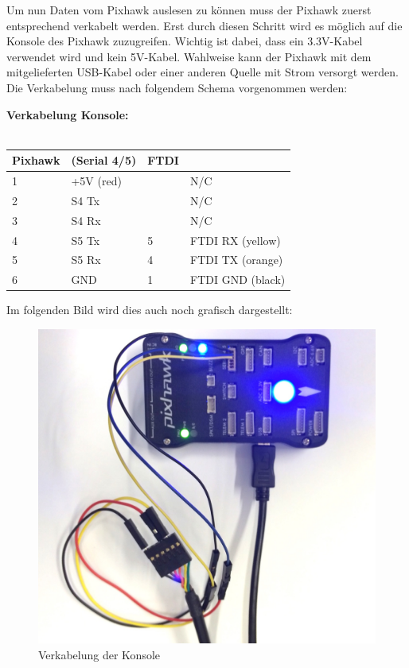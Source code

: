 \documentclass[12pt]{article} %
\begin{document}
	Um nun Daten vom Pixhawk auslesen zu können muss der Pixhawk zuerst entsprechend verkabelt werden. Erst durch diesen Schritt wird es möglich auf die Konsole des Pixhawk zuzugreifen. Wichtig ist dabei, dass ein 3.3V-Kabel verwendet wird und kein 5V-Kabel. Wahlweise kann der Pixhawk mit dem mitgelieferten USB-Kabel oder einer anderen Quelle mit Strom versorgt werden. Die Verkabelung muss nach folgendem Schema vorgenommen werden:\\
\begin{description}
	\item \textbf{Verkabelung Konsole:}\\ \\
	\begin{tabular}{p{2cm}p{4cm}p{2cm}p{4cm}}
		\centering 
		\textbf{ Pixhawk} & \textbf{(Serial 4/5)} & \textbf{FTDI}& \\ \hline
		1 & +5V (red)	& 		& N/C				\\ \hline
		2 & S4 Tx	 	&		& N/C				\\ \hline
		3 & S4 Rx		&		& N/C				\\ \hline
		4 & S5 Tx		& 5		& FTDI RX (yellow)	\\ \hline
		5 & S5 Rx		& 4		& FTDI TX (orange)	\\ \hline
		6 & GND			& 1		& FTDI GND (black)	\\ \hline
		
	\end{tabular}
\end{description}

Im folgenden Bild wird dies auch noch grafisch dargestellt:

	\begin{figure}[H]
		\centering
		\includegraphics[scale=0.3]{Verkabelung_Mav}
		\caption{Verkabelung der Konsole}
		\label{2}
	\end{figure}
	
\end{document}
